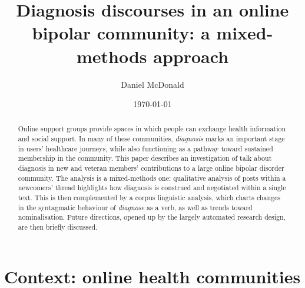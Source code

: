 \documentclass{article}
\author{Daniel McDonald}
\date{\today}
\title{Diagnosis discourses in an online bipolar community: a mixed-methods approach}
\begin{document}
\maketitle


\begin{abstract}
Online support groups provide spaces in which people can exchange health information and social support.
In many of these communities, \emph{diagnosis} marks an important stage in users' healthcare journeys, while also functioning as a pathway toward sustained membership in the community. This paper describes an investigation of talk about diagnosis in new and veteran members' contributions to a large online bipolar disorder community. The analysis is a mixed-methods one: qualitative analysis of posts within a newcomers' thread highlights how diagnosis is construed and negotiated within a single text. This is then complemented by a corpus linguistic analysis, which charts changes in the syntagmatic behaviour of \emph{diagnose} as a verb, as well as trends toward nominalisation. Future directions, opened up by the largely automated research design, are then briefly discussed.
\end{abstract}

\section{Context: online health communities}
\end{document}
